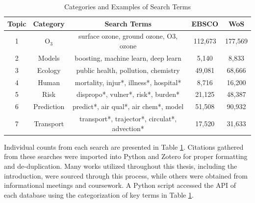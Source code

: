 \begin{table}[h]
    \centering
        \begin{tabular}{|c|cccc|}
            \hline
             Topic & Category & Search Terms & EBSCO & WoS \\
            \hline
             1 & O$_3$ & surface ozone, ground ozone, O3, ozone & 112,673 & 177,569 \\
             2 & Models & boosting, machine learn, deep learn & 5,140 & 8,833 \\
             3 & Ecology & public health, pollution, chemistry & 49,081 & 68,666 \\
             4 & Human & mortality, injur*, illness*, hospital* & 8,716 & 16,200 \\
             5 & Risk & dispropo*, vulner*, risk*, burden* & 21,125 & 48,387 \\
             6 & Prediction & predict*, air qual*, air chem*, model & 51,508 & 90,932 \\
             7 & Transport & transport*, trajector*, circulat*, advection* & 17,520 & 31,633 \\
            \hline
        \end{tabular}
    \caption{Categories and Examples of Search Terms}
    \label{tab:literature-count}
\end{table}
Individual counts from each search are presented in Table \ref{tab:literature-count}. Citations gathered from these searches were imported into Python and Zotero for proper formatting and de-duplication. Many works utilized throughout this thesis, including the introduction, were sourced through this process, while others were obtained from informational meetings and coursework. A Python script accessed the API of each database using the categorization of key terms in Table \ref{tab:literature-count}. 

